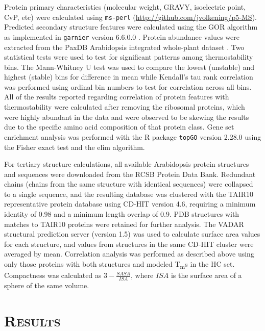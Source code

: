\documentclass[11pt,letter]{article}\usepackage[]{graphicx}\usepackage[]{color}
\newcommand{\Tm}{T\textsubscript{m}}
\newcommand{\sw}[1]{\texttt{#1}}
\begin{document}
Protein primary characteristics (molecular weight, GRAVY, isoelectric point,
CvP, etc) were calculated using \sw{ms-perl}
(\url{http://github.com/jvolkening/p5-MS}). Predicted secondary structure
features were calculated using the GOR algorithm as implemented in
\sw{garnier} version 6.6.0.0 \cite{rice_emboss:_2000, garnier_analysis_1978}.
Protein abundance values were extracted from the PaxDB Arabidopsis integrated
whole-plant dataset \cite{wang_paxdb_2012}. Two statistical tests were used to
test for significant patterns among thermostability bins. The Mann-Whitney U
test was used to compare the lowest (unstable) and highest (stable) bins for
difference in mean while Kendall's tau rank correlation was performed using
ordinal bin numbers to test for correlation across all bins. All of the
results reported regarding correlation of protein features with
thermostability were calculated after removing the ribosomal proteins, which
were highly abundant in the data and were observed to be skewing the results
due to the specific amino acid composition of that protein class. Gene set
enrichment analysis was performed with the R package \sw{topGO} version 2.28.0
\cite{alexa_improved_2006} using the Fisher exact test and the elim algorithm. 

For tertiary structure calculations, all available Arabidopsis protein
structures and sequences were downloaded from the RCSB Protein Data Bank.
Redundant chains (chains from the same structure with identical sequences)
were collapsed to a single sequence, and the resulting database was clustered
with the TAIR10 representative protein database using CD-HIT version 4.6,
requiring a minimum identity of 0.98 and a minimum length overlap of 0.9. PDB
structures with matches to TAIR10 proteins were retained for further analysis.
The VADAR structural prediction server (version 1.5)
\cite{willard_vadar:_2003} was used to calculate surface area values for each
structure, and values from structures in the same CD-HIT cluster were averaged
by mean. Correlation analysis was performed as described above using only
those proteins with both structures and modeled \Tm{}s in the
HC set. Compactness was calculated as $3-\frac{SASA}{ISA}$,
where $ISA$ is the surface area of a sphere of the same volume.


\section*{\textsc{Results}}
\end{document}
